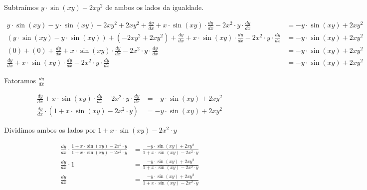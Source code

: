 \documentclass{article}
\begin{document}
Subtraímos \(y \cdot \sin(xy) - 2xy^2\) de ambos os lados da igualdade.

\begin{align*}
    y \cdot \sin(xy)
    - y \cdot \sin(xy)
    -
    2
    x
    y^2
    + 2xy^2
    +
    \frac{dy}{dx}
    +
    x \cdot \sin(xy) \cdot \frac{dy}{dx}
    -
    2
    x^2
    \cdot
    y
    \cdot
    \frac{dy}{dx}
     & =
    - y \cdot \sin(xy) + 2xy^2
    \\
    (
    y \cdot \sin(xy)
    - y \cdot \sin(xy)
    )
    +
    (
    -
    2
    x
    y^2
    +
    2xy^2
    )
    +
    \frac{dy}{dx}
    +
    x \cdot \sin(xy) \cdot \frac{dy}{dx}
    -
    2
    x^2
    \cdot
    y
    \cdot
    \frac{dy}{dx}
     & =
    - y \cdot \sin(xy) + 2xy^2
    \\
    (
    0
    )
    +
    (
    0
    )
    +
    \frac{dy}{dx}
    +
    x \cdot \sin(xy) \cdot \frac{dy}{dx}
    -
    2
    x^2
    \cdot
    y
    \cdot
    \frac{dy}{dx}
     & =
    - y \cdot \sin(xy) + 2xy^2
    \\
    \frac{dy}{dx}
    +
    x \cdot \sin(xy) \cdot \frac{dy}{dx}
    -
    2
    x^2
    \cdot
    y
    \cdot
    \frac{dy}{dx}
     & =
    - y \cdot \sin(xy) + 2xy^2
\end{align*}

Fatoramos \(\frac{dy}{dx}\)

\begin{align*}
    \frac{dy}{dx}
    +
    x \cdot \sin(xy) \cdot \frac{dy}{dx}
    -
    2
    x^2
    \cdot
    y
    \cdot
    \frac{dy}{dx}
     & =
    - y \cdot \sin(xy) + 2xy^2
    \\
    \frac{dy}{dx}
    \cdot
    (
    1
    +
    x \cdot \sin(xy)
    -
    2
    x^2
    \cdot
    y
    )
     & =
    - y \cdot \sin(xy) + 2xy^2
\end{align*}

Dividimos ambos os lados por \(
1
+
x \cdot \sin(xy)
-
2
x^2
\cdot
y
\)

\begin{align*}
    \frac{dy}{dx}
    \cdot
    \frac{
        1
        +
        x \cdot \sin(xy)
        -
        2
        x^2
        \cdot
        y
    }{
        1
        +
        x \cdot \sin(xy)
        -
        2
        x^2
        \cdot
        y
    }
     & =
    \frac{
        - y \cdot \sin(xy) + 2xy^2
    }{
        1
        +
        x \cdot \sin(xy)
        -
        2
        x^2
        \cdot
        y
    }
    \\
    \frac{dy}{dx}
    \cdot
    1
     & =
    \frac{
        - y \cdot \sin(xy) + 2xy^2
    }{
        1
        +
        x \cdot \sin(xy)
        -
        2
        x^2
        \cdot
        y
    }
    \\
    \frac{dy}{dx}
     & =
    \frac{
        - y \cdot \sin(xy) + 2xy^2
    }{
        1
        +
        x \cdot \sin(xy)
        -
        2
        x^2
        \cdot
        y
    }
\end{align*}
\end{document}
